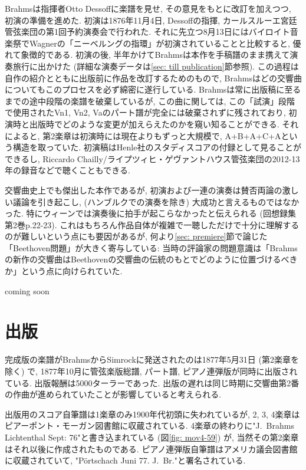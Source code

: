 Brahmsは指揮者Otto Dessoffに楽譜を見せ, その意見をもとに改訂を加えつつ, 初演の準備を進めた.
初演は1876年11月4日, Dessoffの指揮, カールスルーエ宮廷管弦楽団の第1回予約演奏会で行われた.
それに先立つ8月13日にはバイロイト音楽祭でWagnerの「ニーベルングの指環」が初演されていることと比較すると, 優れて象徴的である.
初演の後, 半年かけてBrahmsは本作を手稿譜のまま携えて演奏旅行に出かけた (詳細な演奏データは\ref{sec: till publication}節参照).
この過程は自作の紹介とともに出版前に作品を改訂するためのもので, Brahmsはどの交響曲についてもこのプロセスを必ず綿密に遂行している.
Brahmsは常に出版稿に至るまでの途中段階の楽譜を破棄しているが, この曲に関しては,
この「試演」段階で使用されたVn1, Vn2, Vaのパート譜が完全には破棄されずに残されており, 初演時と出版時でどのような変更が加えらえたのかを窺い知ることができる.
それによると, 第2楽章は初演時には現在よりもずっと大規模で, A+B+A+C+Aという構造を取っていた.
初演稿はHenle社のスタディスコアの付録として見ることができる\cite{henle}し, Riccardo Chailly/ライプツィヒ・ゲヴァントハウス管弦楽団の2012-13年の録音などで聴くこともできる.

交響曲史上でも傑出した本作であるが, 初演および一連の演奏は賛否両論の激しい議論を引き起こし, (ハンブルクでの演奏を除き) 大成功と言えるものではなかった\cite{compos}.
特にウィーンでは演奏後に拍手が起こらなかったと伝えられる (回想録集\cite{kaisouroku}第2巻p.22-23).
これはもちろん作品自体が複雑で一聴しただけで十分に理解するのが難しいという点にも要因があるが, 何より\ref{sec: premiere}節で論じた「Beethoven問題」が大きく寄与している:
当時の評論家の問題意識は「Brahmsの新作の交響曲はBeethovenの交響曲の伝統のもとでどのように位置づけるべきか」という点に向けられていた\cite{frisch}.

coming soon


\section{出版}

完成版の楽譜がBrahmsからSimrockに発送されたのは1877年5月31日 (第2楽章を除く) で\cite{library},
1877年10月に管弦楽版総譜, パート譜, ピアノ連弾版が同時に出版されている\cite{frisch}. 出版報酬は5000ターラーであった\cite{henle}.
出版の遅れは同じ時期に交響曲第2番の作曲が進められていたことが影響していると考えられる.

出版用のスコア自筆譜は1楽章のみ1900年代初頭に失われているが, 2, 3, 4楽章はピアーポント・モーガン図書館に収蔵されている.
4楽章の終わりに"J.~Brahms Lichtenthal Sept: 76"と書き込まれている (図\ref{fig: mov4-59}) が, 当然その第2楽章はそれ以後に作成されたものである.
ピアノ連弾版自筆譜はアメリカ議会図書館に収蔵されていて, "Pörtschach Juni 77. J.~Br."と署名されている\cite{frisch}.

